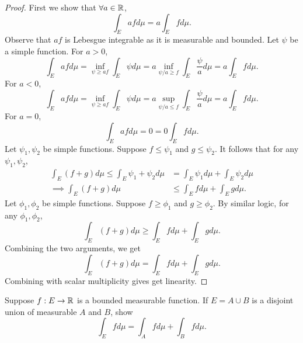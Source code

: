 \documentclass[class=book, crop=false]{standalone}
\begin{document}
        \begin{proof}
            First we show that $\forall a \in \mathbb{R}$,
            \begin{equation*}
                \int_E af d\mu = a \int_E f d\mu.
            \end{equation*}
            Observe that $af$ is Lebesgue integrable as it is measurable and bounded. Let $\psi$ be a simple function. For $a > 0$, 
            \begin{equation*}
                \int_E af d\mu = \inf_{\psi \geq af} \int_E \psi d\mu = a \inf_{\psi / a \geq f} \int_{E} \frac{\psi}{a} d\mu = a \int_E f d\mu.
            \end{equation*}
            For $a < 0$,
            \begin{equation*}
                \int_E af d\mu = \inf_{\psi \geq af} \int_E \psi d\mu = a \sup_{\psi / a \leq f} \int_{E} \frac{\psi}{a} d\mu = a \int_E f d\mu.
            \end{equation*}
            For $a = 0$,
            \begin{equation*}
                \int_E af d\mu = 0 = 0 \int_E f d\mu.
            \end{equation*}
            Let $\psi_1, \psi_2$ be simple functions. Suppose $f \leq \psi_1$ and $g \leq \psi_2$. It follows that for any $\psi_1, \psi_2$,
            \begin{align*}
                \int_E (f + g) d\mu \leq \int_E \psi_1 + \psi_2 d\mu &= \int_E \psi_1 d\mu + \int_E \psi_2 d\mu \\
                \implies \int_E (f + g) d\mu &\leq \int_E f d\mu + \int_E g d\mu.
            \end{align*}
            Let $\phi_1, \phi_2$ be simple functions. Suppose $f \geq \phi_1$ and $g \geq \phi_2$. By similar logic, for any $\phi_1, \phi_2$,
            \begin{equation*}
                \int_E (f + g) d\mu \geq \int_E f d\mu + \int_E g d\mu.
            \end{equation*}
            Combining the two arguments, we get
            \begin{equation*}
                \int_E (f + g) d\mu = \int_E f d\mu + \int_E g d\mu.
            \end{equation*}
            Combining with scalar multiplicity gives get linearity.
        \end{proof}

        \begin{question}
            Suppose $f: E \rightarrow \mathbb{R}$ is a bounded measurable function. If $E = A \cup B$ is a disjoint union of measurable $A$ and $B$, show
            \begin{equation*}
                \int_{E} f d\mu = \int_{A} f d\mu + \int_{B} f d\mu.
            \end{equation*}
        \end{question}
\end{document}
